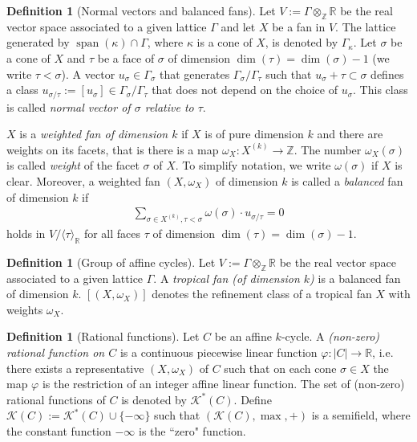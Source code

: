 \documentclass[11pt,reqno,a4]{amsart}
\theoremstyle{dotless}
\theoremstyle{definition}
\newtheorem{definition}[corollary]{Definition}
\begin{document}
\begin{definition}[Normal vectors and balanced fans]
Let $V:=\Gamma\otimes_{\mathbb{Z}}\mathbb{R}$ be the real vector space associated to a given lattice $\Gamma$ and let $X$ be a fan in $V$. The lattice generated by $\operatorname{span}(\kappa)\cap\Gamma$, where $\kappa$ is a cone of $X$, is denoted by $\Gamma_\kappa$. Let $\sigma$ be a cone of $X$ and $\tau$ be a face of $\sigma$ of dimension $\dim(\tau)=\dim(\sigma)-1$ (we write $\tau<\sigma$). A vector $u_{\sigma}\in\Gamma_\sigma$ that generates $\Gamma_\sigma / \Gamma_\tau$ such that $u_\sigma+\tau\subset\sigma$ defines a class $u_{\sigma / \tau}:=[u_\sigma]\in\Gamma_\sigma / \Gamma_\tau$ that does not depend on the choice of $u_\sigma$. This class is called \textit{normal vector of $\sigma$ relative to $\tau$}.

$X$ is a \textit{weighted fan of dimension $k$} if $X$ is of pure dimension $k$ and there are weights on its facets, that is there is a map $\omega_X:X^{(k)}\to\mathbb{Z}$. The number $\omega_X(\sigma)$ is called \textit{weight} of the facet $\sigma$ of $X$. To simplify notation, we write $\omega(\sigma)$ if $X$ is clear. Moreover, a weighted fan $(X,\omega_X)$ of dimension $k$ is called a \textit{balanced} fan of dimension $k$ if
\begin{align*}
\sum_{\sigma \in X^{(k)}, \tau < \sigma} \omega(\sigma)\cdot u_{\sigma / \tau} = 0
\end{align*}
holds in $V/\langle\tau\rangle_{\mathbb{R}}$ for all faces $\tau$ of dimension $\dim(\tau)=\dim(\sigma)-1$.
\end{definition}



\begin{definition}[Group of affine cycles]
Let $V:=\Gamma\otimes_{\mathbb{Z}}\mathbb{R}$ be the real vector space associated to a given lattice $\Gamma$. A \textit{tropical fan (of dimension $k$)} is a balanced fan of dimension $k$. $[(X,\omega_X)]$ denotes the refinement class of a tropical fan $X$ with weights $\omega_X$.
\end{definition}


\begin{definition}[Rational functions]
Let $C$ be an affine $k$-cycle. A \textit{(non-zero) rational function on $C$} is a continuous piecewise linear function $\varphi:|C|\to\mathbb{R}$, i.e. there exists a representative $(X,\omega_X)$ of $C$ such that on each cone $\sigma\in X$ the map $\varphi$ is the restriction of an integer affine linear function. The set of (non-zero) rational functions of $C$ is denoted by $\mathcal{K}^*(C)$. Define $\mathcal{K}(C):=\mathcal{K}^*(C)\cup \{-\infty\}$ such that $(\mathcal{K}(C),\operatorname{max},+)$ is a semifield, where the constant function $-\infty$ is the ``zero" function.
\end{definition}
\end{document}
